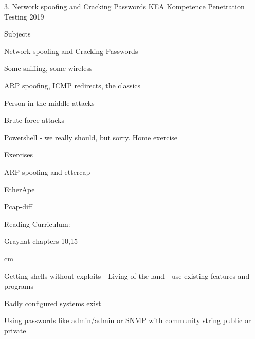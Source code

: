 \documentclass[Screen16to9,17pt]{foils}
\begin{document}
\mytitlepage
{3. Network spoofing and Cracking Passwords}
{KEA Kompetence Penetration Testing 2019}





\begin{list1}
\item Subjects
\begin{list2}
\item Network spoofing and Cracking Passwords
\item Some sniffing, some wireless
\item ARP spoofing, ICMP redirects, the classics
\item Person in the middle attacks
\item Brute force attacks
\item Powershell - we really should, but sorry. Home exercise
\end{list2}
\item Exercises
\begin{list2}
\item ARP spoofing and ettercap
\item EtherApe
\item Pcap-diff
\end{list2}
\item  Reading Curriculum:
\begin{list2}
\item Grayhat chapters 10,15
\end{list2}
\end{list1}



 cm


\begin{list2}
\item Getting shells without exploits -
 Living of the land - use existing features and programs
\item Badly configured systems exist
\item Using passwords like admin/admin or SNMP with community string {public} or {private}
\end{list2}
\end{document}
